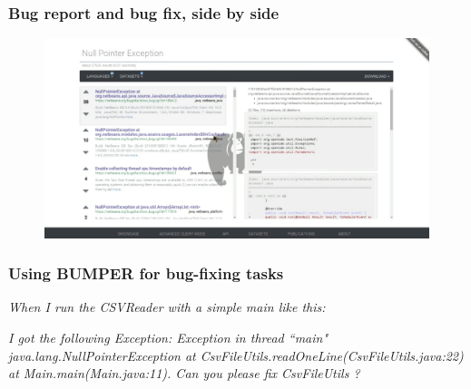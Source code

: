 \documentclass{beamer}
\begin{document}
\begin{frame}

  \frametitle{Bug report and bug fix, side by side}

  \begin{figure}
    \centering
    \includegraphics[width=1\textwidth]{../media/interface2.png}
  \end{figure}

\end{frame}

\begin{frame}

  \frametitle{Using BUMPER for bug-fixing tasks}

  \textit{When I run the CSVReader with a simple main like this:}

  \noindent\begin{minipage}{0.90\linewidth}

   

  \end{minipage}

  \textit{I got the following Exception: Exception in thread ``main" java.lang.NullPointerException at CsvFileUtils.readOneLine(CsvFileUtils.java:22) at Main.main(Main.java:11). Can you please fix CsvFileUtils ?}
\end{frame}
\end{document}
